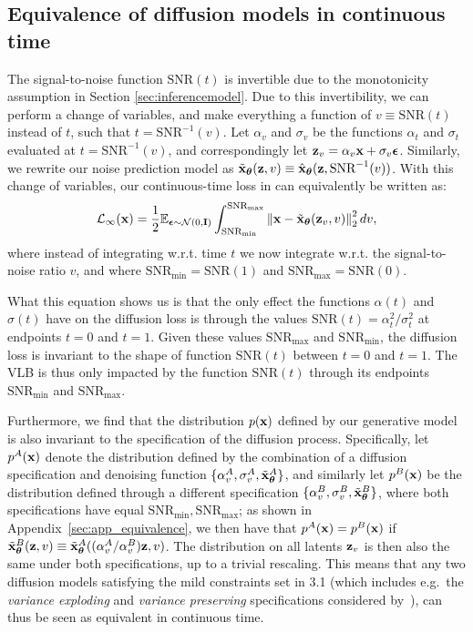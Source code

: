 \documentclass{article}
\newcommand{\linfty}{\mathcal{L}_{\infty}(\rvx)}
\newcommand{\snr}{\text{SNR}}
\newcommand{\snrmin}{\text{SNR}_{\text{min}}}
\newcommand{\snrmax}{\text{SNR}_{\text{max}}}
\begin{document}
\subsection{Equivalence of diffusion models in continuous time}
\label{sec:schedule_invariance}
The signal-to-noise function $\snr(t)$ is invertible due to the monotonicity assumption in Section \ref{sec:inferencemodel}. Due to this invertibility, we can perform a change of variables, and make everything a function of $v \equiv \snr(t)$ instead of $t$, such that $t = \snr^{-1}(v)$. Let $\alpha_v$ and $\sigma_v$ be the functions $\alpha_t$ and $\sigma_t$ evaluated at $t = \snr^{-1}(v)$, and correspondingly let ${\mathbf{z}}_v = \alpha_v {\mathbf{x}} + \sigma_v {\boldsymbol{\epsilon}}$. Similarly, we rewrite our noise prediction model as $\tilde{\rvx}_{\bT}(\rvz, v) \equiv \hat{\rvx}_{\bT}(\rvz, \snr^{-1}(v))$. With this change of variables, our continuous-time loss in  can equivalently be written as:
\begin{align}
\linfty = \frac{1}{2}\E_{\bepsilon\sim\mathcal{N}(0,\bfI)} \int_{\snrmin}^{\snrmax} \left\rVert \rvx - \tilde{\rvx}_{\bT}(\rvz_v, v) \right\lVert_{2}^{2} dv,
\label{eq:elbo_v}
\end{align}
where instead of integrating w.r.t. time $t$ we now integrate w.r.t. the signal-to-noise ratio $v$, and where $\snr_\text{min}=\snr(1)$ and $\snr_\text{max}=\snr(0)$.

What this equation shows us is that the only effect the functions $\alpha(t)$ and $\sigma(t)$ have on the diffusion loss is through the values $\snr(t) = \alpha^{2}_t/\sigma^{2}_t$ at endpoints $t=0$ and $t=1$. Given these values $\snr_\text{max}$ and $\snr_\text{min}$, the diffusion loss is invariant to the shape of function $\snr(t)$ between $t=0$ and $t=1$. The VLB is thus only impacted by the function $\snr(t)$ through its endpoints $\snrmin$ and $\snrmax$. 

%
%
Furthermore, we find that the distribution $p({\mathbf{x}})$ defined by our generative model is also invariant to the specification of the diffusion process. Specifically, let $p^{A}({\mathbf{x}})$ denote the distribution defined by the combination of a diffusion specification and denoising function $\{\alpha^A_v, \sigma^A_v, \tilde{{\mathbf{x}}}^A_{{\boldsymbol{\theta}}}\}$, and similarly let $p^{B}({\mathbf{x}})$ be the distribution defined through a different specification $\{\alpha^B_v, \sigma^B_v, \tilde{{\mathbf{x}}}^B_{{\boldsymbol{\theta}}}\}$, where both specifications have equal $\snr_\text{min}, \snr_\text{max}$; as shown in Appendix~\ref{sec:app_equivalence}, we then have that $p^{A}({\mathbf{x}}) = p^{B}({\mathbf{x}})$ if $\tilde{{\mathbf{x}}}^B_{{\boldsymbol{\theta}}}({\mathbf{z}}, v) \equiv \tilde{{\mathbf{x}}}^A_{{\boldsymbol{\theta}}}((\alpha^A_v/\alpha^B_v){\mathbf{z}}, v)$. The distribution on all latents ${\mathbf{z}}_v$ is then also the same under both specifications, up to a trivial rescaling. This means that any two diffusion models satisfying the mild constraints set in 3.1 (which includes e.g.\ the \emph{variance exploding} and \emph{variance preserving} specifications considered by~\cite{song2020score}), can thus be seen as equivalent in continuous time.
\end{document}
